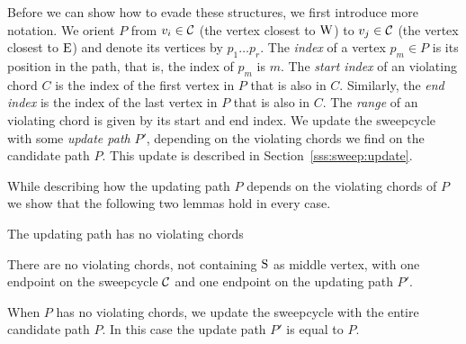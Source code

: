   Before we can show how to evade these structures, we first introduce more notation. We orient $P$ from $v_i \in \mathcal{C}$ (the vertex closest to $\mathrm{W}$) to $v_j \in \mathcal{C}$ (the vertex closest to $\mathrm{E}$) and denote its vertices by $p_1 \ldots p_r$.
  The \emph{index} of a vertex $p_m \in P$ is its position in the path, that is, the index of $p_m$ is $m$.
  The \emph{start index} of an violating chord $C$ is the index of the first vertex in $P$ that is also in $C$. Similarly, the \emph{end index} is the index of the last vertex in $P$ that is also in $C$.
  The \emph{range} of an violating chord is given by its start and end index. We update the sweepcycle with some \emph{update path} $P'$, depending on the violating chords we find on the candidate path $P$. This update is described in Section~\ref{sss:sweep:update}.

  While describing how the updating path $P$ depends on the violating chords of $P$ we show that the following two lemmas hold in every case.

  \begin{lemma}
    The updating path has no violating chords
    \label{lm:sweep:augNoIregularity}
  \end{lemma}

  \begin{lemma}
    \label{lm:sweep:noConnectingIregularity}
    There are no violating chords, not containing $\mathrm{S}$ as middle vertex, with one endpoint on the sweepcycle $\mathcal{C}$ and one endpoint on the updating path $P'$.
  \end{lemma}

    When $P$ has no violating chords, we update the sweepcycle with the entire candidate path $P$.
    In this case the update path $P'$ is equal to $P$.

